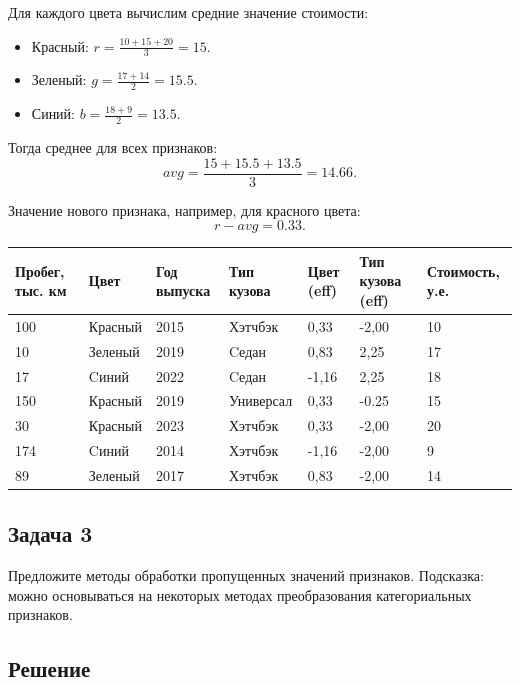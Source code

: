 Для каждого цвета вычислим средние значение стоимости:
\begin{itemize}
	\item Красный: $r = \frac{10+15+20}{3}=15$.
	\item Зеленый: $g = \frac{17+14}{2}=15.5$.
	\item Синий: $b = \frac{18+9}{2}=13.5$.
\end{itemize}

Тогда среднее для всех признаков:
$$ avg = \frac{15 + 15.5 + 13.5}{3} = 14.66. $$

Значение нового признака, например, для красного цвета:
$$ r - avg = 0.33. $$

\begin{table}[ht]
	\footnotesize
	\begin{tabular}{lllllll}
		\hline
		Пробег, тыс. км & Цвет    & Год выпуска & Тип кузова & Цвет (eff) & Тип кузова (eff) & Стоимость, у.е. \\ \hline
		100             & Красный & 2015        & Хэтчбэк    & 0,33        & -2,00           & 10           \\
		10              & Зеленый & 2019        & Cедан      & 0,83        & 2,25            & 17           \\
		17              & Cиний   & 2022        & Cедан      & -1,16      & 2,25             & 18           \\
		150             & Красный & 2019        & Универсал  & 0,33        & -0.25             & 15           \\
		30              & Красный & 2023        & Хэтчбэк    & 0,33        & -2,00            & 20           \\
		174             & Cиний   & 2014        & Хэтчбэк    & -1,16      & -2,00            & 9            \\
		89              & Зеленый & 2017        & Хэтчбэк    & 0,83        & -2,00            & 14           \\ \hline
	\end{tabular}
\end{table}

\subsection*{Задача 3}

Предложите методы обработки пропущенных значений признаков.
Подсказка: можно основываться на некоторых методах преобразования категориальных признаков.

\subsection*{Решение}

